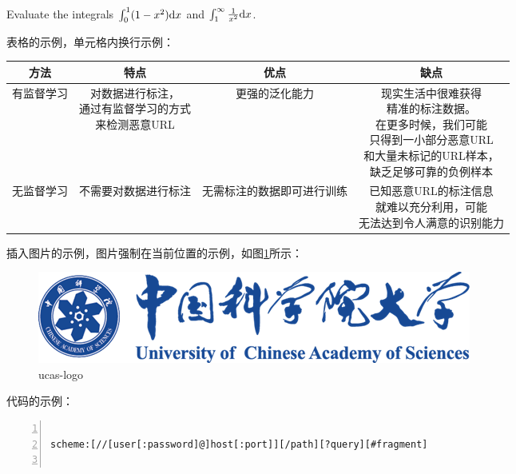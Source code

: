 \documentclass{article}
\begin{document}
\begin{homeworkProblem}[6]
	Evaluate the integrals
	\(\int_0^1 (1 - x^2) \mathrm{d}x\)
	and
	\(\int_1^{\infty} \frac{1}{x^2} \mathrm{d}x\).
\end{homeworkProblem}


\begin{homeworkProblem}
	表格的示例，单元格内换行示例：\\
	
	\begin{tabular}{|c|c|c|c|}
		\hline 
		方法 & 特点 & 优点 & 缺点  \\ 
		\hline 
		有监督学习 & \tabincell{c}{对数据进行标注，\\ 通过有监督学习的方式\\ 来检测恶意URL} & 更强的泛化能力 & \tabincell{l}{现实生活中很难获得\\ 精准的标注数据。\\ 在更多时候，我们可能\\ 只得到一小部分恶意URL\\ 和大量未标记的URL样本，\\ 缺乏足够可靠的负例样本} \\ 
		\hline 
		无监督学习 & 不需要对数据进行标注 & 无需标注的数据即可进行训练 & \tabincell{c}{已知恶意URL的标注信息\\ 就难以充分利用，可能\\ 无法达到令人满意的识别能力} \\
		\hline
	\end{tabular} 
\end{homeworkProblem}


\begin{homeworkProblem}
	插入图片的示例，图片强制在当前位置的示例，如图\ref{fig:ucas-logo}所示：\\
	
	\begin{figure}[H]  %
		\centering
		\includegraphics[width=0.7\linewidth]{images/title/ucas-logo}
		\caption{ucas-logo}
		\label{fig:ucas-logo}
	\end{figure}
	
\end{homeworkProblem}


\begin{homeworkProblem}
	代码的示例：\\
	
\begin{lstlisting}[language = HTML, numbers=left, 
numberstyle=\tiny,keywordstyle=\color{blue!70},
commentstyle=\color{red!50!green!50!blue!50},frame=shadowbox,
rulesepcolor=\color{red!20!green!20!blue!20},basicstyle=\ttfamily]

scheme:[//[user[:password]@]host[:port]][/path][?query][#fragment]


\end{lstlisting}
	
	
\end{homeworkProblem}
\end{document}
